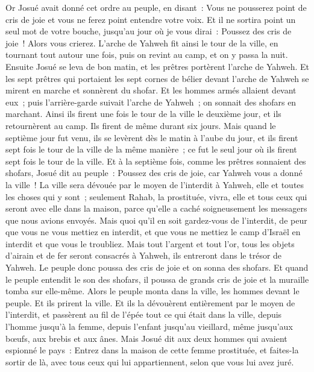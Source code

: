 \begin{multicols}{2}
Or Josué avait donné cet ordre au peuple, en disant~: Vous ne pousserez point de cris de joie et vous ne ferez point entendre votre voix. Et il ne sortira point un seul mot de votre bouche, jusqu'au jour où je vous dirai~: Poussez des cris de joie~! Alors vous crierez.
L'arche de Yahweh fit ainsi le tour de la ville, en tournant tout autour une fois, puis on revint au camp, et on y passa la nuit.
Ensuite Josué se leva de bon matin, et les prêtres portèrent l'arche de Yahweh.
Et les sept prêtres qui portaient les sept cornes de bélier devant l'arche de Yahweh se mirent en marche et sonnèrent du shofar. Et les hommes armés allaient devant eux~; puis l'arrière-garde suivait l'arche de Yahweh~; on sonnait des shofars en marchant.
Ainsi ils firent une fois le tour de la ville le deuxième jour, et ils retournèrent au camp. Ils firent de même durant six jours.
Mais quand le septième jour fut venu, ils se levèrent dès le matin à l'aube du jour, et ils firent sept fois le tour de la ville de la même manière~; ce fut le seul jour où ils firent sept fois le tour de la ville.
Et à la septième fois, comme les prêtres sonnaient des shofars, Josué dit au peuple~: Poussez des cris de joie, car Yahweh vous a donné la ville~!
La ville sera dévouée par le moyen de l'interdit à Yahweh, elle et toutes les choses qui y sont~; seulement Rahab, la prostituée, vivra, elle et tous ceux qui seront avec elle dans la maison, parce qu'elle a caché soigneusement les messagers que nous avions envoyés.
Mais quoi qu'il en soit gardez-vous de l'interdit, de peur que vous ne vous mettiez en interdit, et que vous ne mettiez le camp d'Israël en interdit et que vous le troubliez.
Mais tout l'argent et tout l'or, tous les objets d'airain et de fer seront consacrés à Yahweh, ils entreront dans le trésor de Yahweh.
Le peuple donc poussa des cris de joie et on sonna des shofars. Et quand le peuple entendit le son des shofars, il poussa de grands cris de joie et la muraille tomba sur elle-même. Alors le peuple monta dans la ville, les hommes devant le peuple. Et ils prirent la ville. 
Et ils la dévouèrent entièrement par le moyen de l'interdit, et passèrent au fil de l'épée tout ce qui était dans la ville, depuis l'homme jusqu'à la femme, depuis l'enfant jusqu'au vieillard, même jusqu'aux bœufs, aux brebis et aux ânes.
Mais Josué dit aux deux hommes qui avaient espionné le pays~: Entrez dans la maison de cette femme prostituée, et faites-la sortir de là, avec tous ceux qui lui appartiennent, selon que vous lui avez juré.

\end{multicols}
